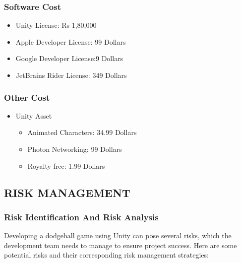 \documentclass[12pt]{report}
\begin{document}
\subsubsection{Software Cost}
\justifying
\setlength{\parindent}{4em}
\setlength{\parskip}{0.5em}
\renewcommand{\baselinestretch}{1.5}
\vspace{0.1cm}
\begin{itemize}
\item Unity License:   Rs 1,80,000
\item Apple Developer License: 99 Dollars
\item Google Developer License:9 Dollars
\item JetBrains Rider License: 349 Dollars
\end{itemize}

\subsubsection{Other Cost}
\justifying
\setlength{\parindent}{4em}
\setlength{\parskip}{0.5em}
\renewcommand{\baselinestretch}{1.5}
\vspace{0.1cm}
\begin{itemize}
\item Unity Asset
\begin{itemize}
\item Animated Characters: 34.99 Dollars
\item Photon Networking: 99 Dollars
\item Royalty free:  1.99 Dollars
\end{itemize}
\end{itemize}

\subsection{RISK MANAGEMENT}
\justifying
\setlength{\parindent}{4em}
\setlength{\parskip}{0.5em}
\renewcommand{\baselinestretch}{1.5}
\vspace{0.1cm}

\subsubsection{Risk Identification And Risk Analysis}
\justifying
\setlength{\parindent}{2em}
\setlength{\parskip}{0.5em}
\renewcommand{\baselinestretch}{1.5}
\vspace{0.1cm}
\normalsize
Developing a dodgeball game using Unity can pose several risks, which the development team needs to manage to ensure project success. Here are some potential risks and their corresponding risk management strategies:
\end{document}
